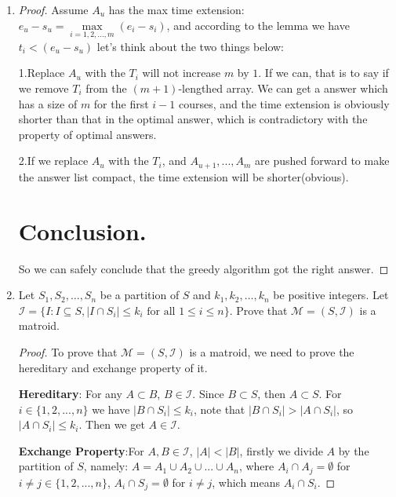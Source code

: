 \documentclass[12pt,a4paper]{article}
\makeatletter
\newtheorem*{solution}{Solution}
\theoremstyle{definition}
\renewenvironment{solution}[1][Solution] {\par\pushQED{\qed}\normalfont\topsep6\p@\@plus6\p@\relax\trivlist\item[\hskip\labelsep\bfseries#1\@addpunct{.}]\ignorespaces}{\popQED\endtrivlist\@endpefalse} \makeatother
\makeatother
\begin{document}
\begin{enumerate}
\begin{solution}
\begin{proof}
         Assume $A_u$ has the max time extension: $e_u - s_u = \max\limits_{i=1,2, ..., m}(e_i - s_i)$, and according to the lemma we have $t_i < (e_u - s_u)$ let's think about the two things below:
         
         1.Replace $A_u$ with the $T_i$ will not increase $m$ by $1$. If we can, that is to say if we remove $T_i$ from the $(m+1)$-lengthed array. We can get a answer which has a size of $m$ for the 
         first $i-1$ courses, and the time extension is obviously shorter than that in the optimal answer, which is contradictory with the property of optimal answers.

         2.If we replace $A_u$ with the $T_i$, and $A_{u+1}, ..., A_{m}$ are pushed forward to make the answer list compact, the time extension will be shorter(obvious).

    \section*{\normalsize{Conclusion.}} 
    So we can safely conclude that the greedy algorithm got the right answer.





    \end{proof}

    \end{solution}

    \item
    Let $S_1,S_2,\dots,S_n$ be a partition of $S$ and $k_1,k_2,\dots,k_n$ be positive integers. Let $\mathcal{I}=\{I: I \subseteq S,|I \cap S_i| \leq k_i \text { for all } 1 \leq i \leq n\}$. Prove that $\mathcal{M}=(S,\mathcal{I})$ is a matroid.

    \begin{proof}
        To prove that $\mathcal{M}=(S, \mathcal{I})$ is a matroid, we need to prove the hereditary and exchange property of it.

        \textbf{Hereditary}: For any $A\subset B$, $B\in\mathcal{I}$. Since $B\subset S$, then $A\subset S$. For $i\in\{1,2, ..., n\}$ we have $|B \cap S_i| \leq k_i$, note that $|B \cap S_i| > |A \cap S_i|$, so $|A \cap S_i| \leq k_i$. Then we get $A\in\mathcal{I}$.  


        \textbf{Exchange Property}:For $A,B\in\mathcal{I}$, $|A| < |B|$, firstly we divide $A$ by the partition of $S$, namely: $A = A_1 \cup A_2 \cup... \cup A_n$, where $A_i \cap A_j = \emptyset$ for $i\neq j\in\{1, 2, ..., n\}$,
        $A_i \cap S_j = \emptyset$ for $i\neq j$, which means $A_i \cap S_i$.
        

\end{proof}
\end{enumerate}
\end{document}
